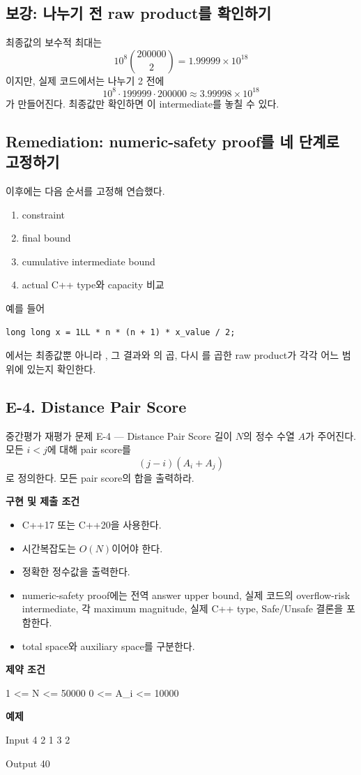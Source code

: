 \subsection{보강: 나누기 전 raw product를 확인하기}
최종값의 보수적 최대는
\[
10^8\binom{200000}{2}=1.99999\times10^{18}
\]
이지만, 실제 코드에서는 나누기 2 전에
\[
10^8\cdot199999\cdot200000
\approx3.99998\times10^{18}
\]
가 만들어진다. 최종값만 확인하면 이 intermediate를 놓칠 수 있다.

\subsection{Remediation: numeric-safety proof를 네 단계로 고정하기}
이후에는 다음 순서를 고정해 연습했다.
\begin{enumerate}
  \item constraint
  \item final bound
  \item cumulative intermediate bound
  \item actual C++ type와 capacity 비교
\end{enumerate}

예를 들어
\begin{lstlisting}
long long x = 1LL * n * (n + 1) * x_value / 2;
\end{lstlisting}
에서는 최종값뿐 아니라 , 그 결과와 의 곱, 다시 를 곱한 raw product가 각각 어느 범위에 있는지 확인한다.

\subsection{E-4. Distance Pair Score}
\begin{problembox}{중간평가 재평가 문제 E-4 --- Distance Pair Score}
길이 $N$의 정수 수열 $A$가 주어진다. 모든 $i<j$에 대해 pair score를
\[
(j-i)(A_i+A_j)
\]
로 정의한다. 모든 pair score의 합을 출력하라.

\textbf{구현 및 제출 조건}
\begin{itemize}
  \item C++17 또는 C++20을 사용한다.
  \item 시간복잡도는 $O(N)$이어야 한다.
  \item 정확한 정수값을 출력한다.
  \item numeric-safety proof에는 전역 answer upper bound, 실제 코드의 overflow-risk intermediate, 각 maximum magnitude, 실제 C++ type, Safe/Unsafe 결론을 포함한다.
  \item total space와 auxiliary space를 구분한다.
\end{itemize}

\textbf{제약 조건}
\begin{TextBlock}
1 <= N <= 50000
0 <= A_i <= 10000
\end{TextBlock}

\textbf{예제}
\begin{TextBlock}
Input
4
2 1 3 2

Output
40
\end{TextBlock}
\end{problembox}

